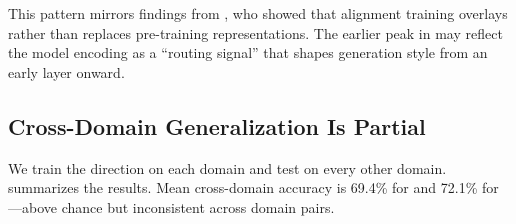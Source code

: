 This pattern mirrors findings from \citet{lee2024mechanistic}, who showed that alignment training overlays rather than replaces pre-training representations.
The earlier peak in \qwen may reflect the model encoding \aistyle as a ``routing signal'' that shapes generation style from an early layer onward.

\subsection{Cross-Domain Generalization Is Partial}
\label{sec:cross_domain}

We train the \diffmean direction on each domain and test on every other domain.
 summarizes the results.
Mean cross-domain accuracy is 69.4\% for \pythia and 72.1\% for \qwen---above chance but inconsistent across domain pairs.

